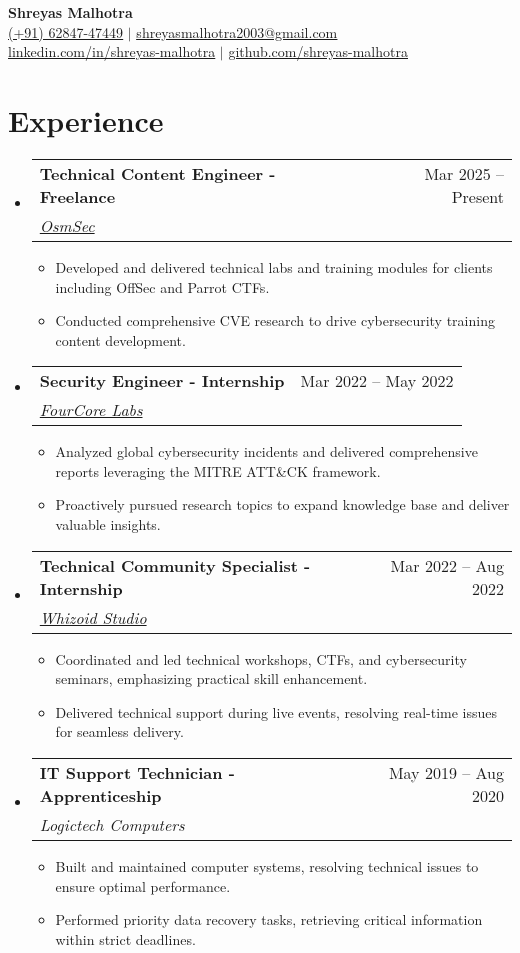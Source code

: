 \documentclass[letterpaper,12pt]{article}
\newcommand{\resumeItem}[1]{
  \item[--]\small{#1} %
}
\newcommand{\resumeSubheading}[4]{
  \item \vspace{1pt}
    \begin{tabularx}{\textwidth}{Xr}
      \textbf{#1} & #2 \\
      \textit{\small#3} & \textit{\small #4} \\
    \end{tabularx} \vspace{1pt}
}
\newcommand{\resumeItemListStart}{\begin{itemize}[topsep=1pt, itemsep=1pt, leftmargin=0.2in]}
\newcommand{\resumeItemListEnd}{\end{itemize} \vspace{1pt}}
\newcommand{\resumeSubHeadingListStart}{\begin{itemize}[leftmargin=0.15in, label={}, topsep=2pt]}
\newcommand{\resumeSubHeadingListEnd}{\end{itemize}}
\begin{document}

\begin{center}
    \textbf{\Huge Shreyas Malhotra} \\ \vspace{4pt}
    \small \href{tel:+916284747449}{\underline{(+91) 62847-47449}} $|$ \small \href{mailto:shreyasmalhotra2003@gmail.com}{\underline{shreyasmalhotra2003@gmail.com}} \\
    \small \href{https://linkedin.com/in/shreyas-malhotra}{\underline{linkedin.com/in/shreyas-malhotra}} $|$
    \small \href{https://github.com/shreyas-malhotra}{\underline{github.com/shreyas-malhotra}}
\end{center}


\section{Experience}
  \resumeSubHeadingListStart
    \resumeSubheading
      {Technical Content Engineer - Freelance}{Mar 2025 -- Present}
      {\href{https://osmsec.xyz}{OsmSec}}{}
      \resumeItemListStart
        \resumeItem{Developed and delivered technical labs and training modules for clients including OffSec and Parrot CTFs.}
        \resumeItem{Conducted comprehensive CVE research to drive cybersecurity training content development.}
      \resumeItemListEnd
    
    \resumeSubheading
      {Security Engineer - Internship}{Mar 2022 -- May 2022}
      {\href{https://fourcore.io}{FourCore Labs}}{}
      \resumeItemListStart
        \resumeItem{Analyzed global cybersecurity incidents and delivered comprehensive reports leveraging the MITRE ATT\&CK framework.}
        \resumeItem{Proactively pursued research topics to expand knowledge base and deliver valuable insights.}
      \resumeItemListEnd

    \resumeSubheading
      {Technical Community Specialist - Internship}{Mar 2022 -- Aug 2022}
      {\href{https://whizoid.com}{Whizoid Studio}}{}
      \resumeItemListStart
        \resumeItem{Coordinated and led technical workshops, CTFs, and cybersecurity seminars, emphasizing practical skill enhancement.}
        \resumeItem{Delivered technical support during live events, resolving real-time issues for seamless delivery.}
      \resumeItemListEnd

    \resumeSubheading
      {IT Support Technician - Apprenticeship}{May 2019 -- Aug 2020}
      {Logictech Computers}{}
      \resumeItemListStart
        \resumeItem{Built and maintained computer systems, resolving technical issues to ensure optimal performance.}
        \resumeItem{Performed priority data recovery tasks, retrieving critical information within strict deadlines.}
      \resumeItemListEnd
  \resumeSubHeadingListEnd
\end{document}
